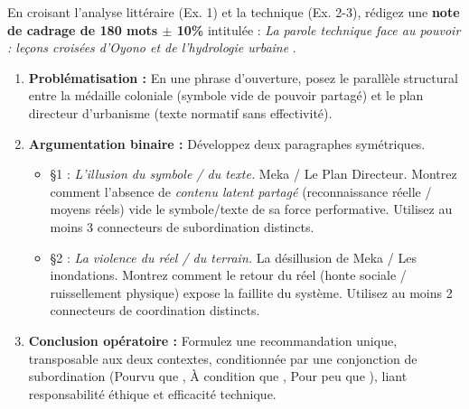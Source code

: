 \documentclass[11pt]{article}
\begin{document}
\begin{exercice}
En croisant l'analyse littéraire (Ex. 1) et la technique (Ex. 2-3), rédigez une \textbf{note de cadrage de 180 mots $\pm$ 10\%} intitulée : \og \textit{La parole technique face au pouvoir : leçons croisées d'Oyono et de l'hydrologie urbaine} \fg{}.
\begin{enumerate}
    \item \textbf{Problématisation :} En une phrase d'ouverture, posez le parallèle structural entre la médaille coloniale (symbole vide de pouvoir partagé) et le plan directeur d'urbanisme (texte normatif sans effectivité).
    \item \textbf{Argumentation binaire :} Développez deux paragraphes symétriques.
    \begin{itemize}
        \item §1 : \textit{L'illusion du symbole / du texte.} Meka / Le Plan Directeur. Montrez comment l'absence de \textit{contenu latent partagé} (reconnaissance réelle / moyens réels) vide le symbole/texte de sa force performative. Utilisez au moins 3 connecteurs de subordination distincts.
        \item §2 : \textit{La violence du réel / du terrain.} La désillusion de Meka / Les inondations. Montrez comment le retour du réel (honte sociale / ruissellement physique) expose la faillite du système. Utilisez au moins 2 connecteurs de coordination distincts.
    \end{itemize}
    \item \textbf{Conclusion opératoire :} Formulez une recommandation unique, transposable aux deux contextes, conditionnée par une conjonction de subordination (\og Pourvu que \fg{}, \og À condition que \fg{}, \og Pour peu que \fg{}), liant responsabilité éthique et efficacité technique.
\end{enumerate}
\end{exercice}
\end{document}
